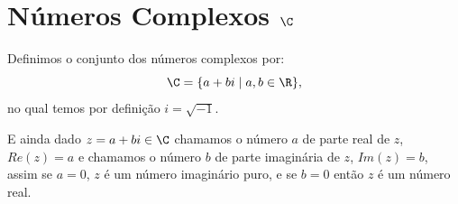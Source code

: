  \chapter{Números Complexos {$\C$}}

 \vskip0.3cm
 \colorbox{azul}{
 \begin{minipage}{0.9\linewidth}
 \begin{center}
  Definimos o conjunto dos números complexos por:
 \[\C= \{a + bi \mid a, b \in \R \} ,\]
 no qual temos por definição $i= \sqrt{-1}$.
 \end{center}
 \end{minipage}}
 \vskip0.3cm

 E ainda dado $z= a+bi \in \C$ chamamos o número $a$ de parte real de $z$, $Re(z)= a$ e chamamos o número $b$ de parte imaginária de $z$, $Im(z)= b$, assim se $a=0$, $z$ é um número imaginário puro, e se $b=0$ então $z$ é um número real.

